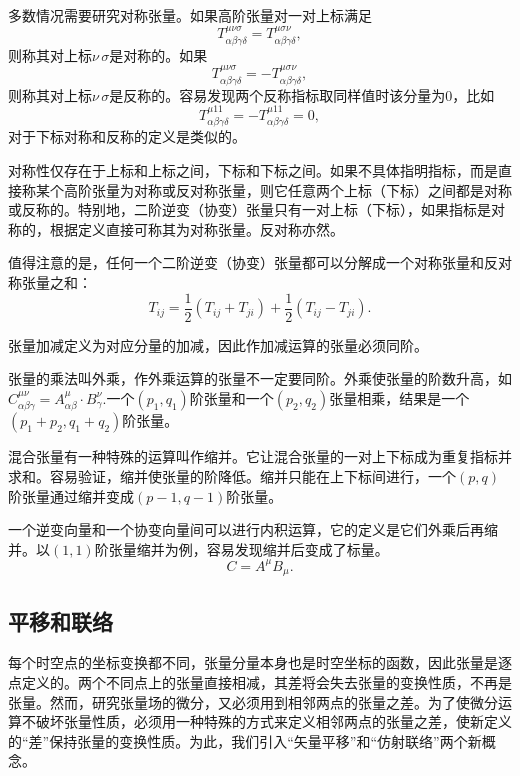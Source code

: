 \documentclass[11pt, a4paper, oneside, onecolumn]{ctexart}
\numberwithin{equation}{subsection}
\begin{document}
多数情况需要研究对称张量。如果高阶张量对一对上标满足
\begin{equation}
T^{\mu\nu\sigma}_{\alpha\beta\gamma\delta{}}=T^{\mu\sigma\nu}_{\alpha\beta\gamma\delta{}},
\end{equation}
则称其对上标$\nu\,\sigma$是对称的。如果
\begin{equation}
T^{\mu\nu\sigma}_{\alpha\beta\gamma\delta{}}=-T^{\mu\sigma\nu}_{\alpha\beta\gamma\delta{}},
\end{equation}
则称其对上标$\nu\,\sigma$是反称的。容易发现两个反称指标取同样值时该分量为0，比如
\begin{equation}
T^{\mu11}_{\alpha\beta\gamma\delta{}}=-T^{\mu11}_{\alpha\beta\gamma\delta{}}=0,
\end{equation}
对于下标对称和反称的定义是类似的。

对称性仅存在于上标和上标之间，下标和下标之间。如果不具体指明指标，而是直接称某个高阶张量为对称或反对称张量，则它任意两个上标（下标）之间都是对称或反称的。特别地，二阶逆变（协变）张量只有一对上标（下标），如果指标是对称的，根据定义直接可称其为对称张量。反对称亦然。

值得注意的是，任何一个二阶逆变（协变）张量都可以分解成一个对称张量和反对称张量之和：
\begin{equation}
T_{ij}=\frac{1}{2}\left(T_{ij}+T_{ji}\right)+\frac{1}{2}\left(T_{ij}-T_{ji}\right).
\end{equation}

张量加减定义为对应分量的加减，因此作加减运算的张量必须同阶。

张量的乘法叫外乘，作外乘运算的张量不一定要同阶。外乘使张量的阶数升高，如$C_{\alpha\beta\gamma}^{\mu\nu}=A_{\alpha\beta}^{\mu}\cdot B_{\gamma}^{\nu}$.一个$\left(p_{1},q_{1}\right)$阶张量和一个$\left(p_{2},q_{2}\right)$张量相乘，结果是一个$\left(p_{1}+p_{2},q_{1}+q_{2}\right)$阶张量。

混合张量有一种特殊的运算叫作缩并。它让混合张量的⼀对上下标成为重复指标并求和。容易验证，缩并使张量的阶降低。缩并只能在上下标间进行，一个$\left(p,q\right)$阶张量通过缩并变成$\left(p-1,q-1\right)$阶张量。

一个逆变向量和一个协变向量间可以进行内积运算，它的定义是它们外乘后再缩并。以$\left(1,1\right)$阶张量缩并为例，容易发现缩并后变成了标量。
\begin{equation}
C=A^{\mu}B_{\mu}.
\end{equation}

\subsection{平移和联络}
每个时空点的坐标变换都不同，张量分量本身也是时空坐标的函数，因此张量是逐点定义的。两个不同点上的张量直接相减，其差将会失去张量的变换性质，不再是张量。然⽽，研究张量场的微分，又必须⽤到相邻两点的张量之差。为了使微分运算不破坏张量性质，必须⽤⼀种特殊的⽅式来定义相邻两点的张量之差，使新定义的“差”保持张量的变换性质。为此，我们引⼊“⽮量平移”和“仿射联络”两个新概念。
\end{document}
